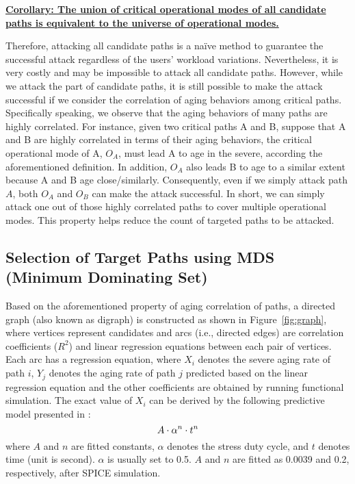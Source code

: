 \noindent \textbf{\uline{Corollary: The union of critical operational modes of all candidate paths is equivalent to the universe of operational modes.}}

Therefore, attacking all candidate paths is a na\"ive method to guarantee the successful attack regardless of the users' workload variations. Nevertheless, it is very costly and may be impossible to attack all candidate paths. 
However, while we attack the part of candidate paths, it is still possible to make the attack successful if we consider the correlation of aging behaviors among critical paths. Specifically speaking, we observe that the aging behaviors of many paths are highly correlated. For instance, given two critical paths A and B, suppose that A and B are highly correlated in terms of their aging behaviors, the critical operational mode of A, $O_{A}$, must lead A to age in the severe, according the aforementioned definition. In addition, $O_{A}$ also leads B to age to a similar extent because A and B age close/similarly. Consequently, even if we simply attack path $A$, both $O_{A}$ and  $O_{B}$ can make the attack successful. In short, we can simply attack one out of those highly correlated paths to cover multiple operational modes. This property helps reduce the count of targeted paths to be attacked.%

\subsection{Selection of Target Paths using MDS (Minimum Dominating Set)}
\label{sec:frame:mds}
Based on the aforementioned property of aging correlation of paths, a directed graph (also known as digraph) is constructed as shown in Figure~\ref{fig:graph}, where vertices represent candidates and arcs (i.e., directed edges) are correlation coefficients ($R^2$) and linear regression equations between each pair of vertices. Each arc has a regression equation, where $X_{i}$ denotes the severe aging rate of path $i$, $Y_{j}$ denotes the aging rate of path $j$ predicted based on the linear regression equation and the other coefficients are obtained by running functional simulation. The exact value of $X_{i}$ can be derived by the following predictive model presented in \cite{wang2007efficient}:
\begin{equation}
	\fontsize{8}{8} \selectfont
	A \cdot \alpha^n \cdot t^n 
	\label{eq:worst}
\end{equation}
where $A$ and $n$ are fitted constants, $\alpha$ denotes the stress duty cycle, and $t$ denotes time (unit is second). $\alpha$ is usually set to 0.5. $A$ and $n$ are fitted as 0.0039 and 0.2, respectively, after SPICE simulation.

